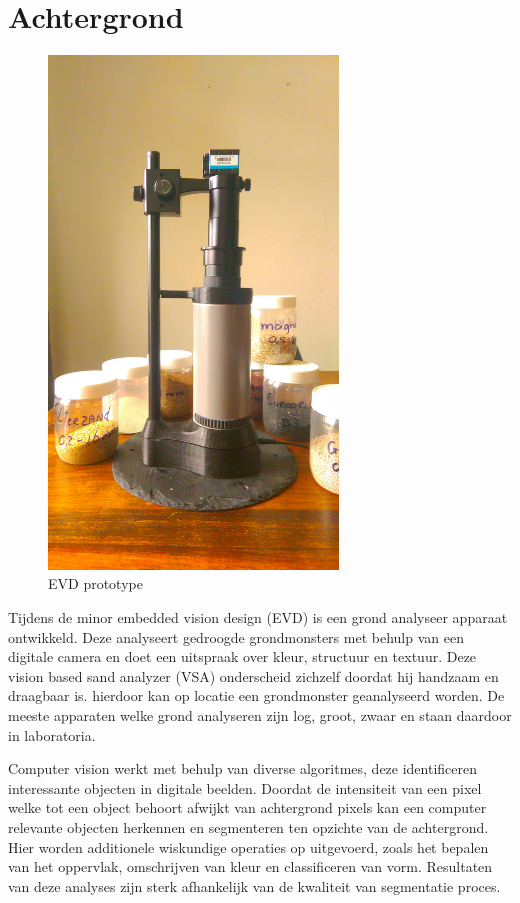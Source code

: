 \documentclass[a4paper,11pt]{../LatexDocStructures/MTItexMemo} %
\begin{document}
\maketitle %
\section{Achtergrond}
\begin{figure}
	\includegraphics[width=7.7cm]{../Pictures/minorprototype.jpg}
	\caption{EVD prototype}
\end{figure}

Tijdens de minor embedded vision design (EVD) is een grond analyseer apparaat ontwikkeld. Deze analyseert gedroogde grondmonsters met behulp van een digitale camera en doet een uitspraak over kleur, structuur en textuur. Deze vision based sand analyzer (VSA) onderscheid zichzelf doordat hij handzaam en draagbaar is. hierdoor kan op locatie een grondmonster geanalyseerd worden. De meeste apparaten welke grond analyseren zijn log, groot, zwaar en staan daardoor in laboratoria.

Computer vision werkt met behulp van diverse algoritmes, deze identificeren interessante objecten in digitale beelden. Doordat de intensiteit van een pixel welke tot een object behoort afwijkt van achtergrond pixels kan een computer relevante objecten herkennen en segmenteren ten opzichte van de achtergrond. Hier worden additionele wiskundige operaties op uitgevoerd, zoals het bepalen van het oppervlak, omschrijven van kleur en classificeren van vorm. Resultaten van deze analyses zijn sterk afhankelijk van de kwaliteit van segmentatie proces.
\end{document}
